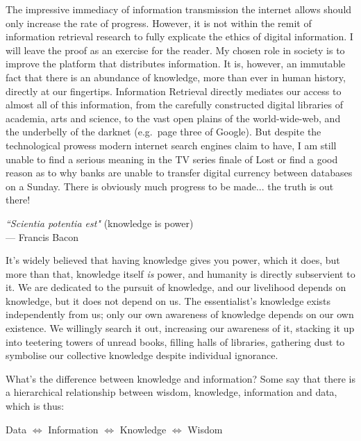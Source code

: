 The impressive immediacy of information transmission the internet allows should only increase the rate of progress. However, it is not within the remit of information retrieval research to fully explicate the ethics of digital information. I will leave the proof as an exercise for the reader. My chosen role in society is to improve the platform that distributes information. It is, however, an immutable fact that there is an abundance of knowledge, more than ever in human history, directly at our fingertips. Information Retrieval directly mediates our access to almost all of this information, from the carefully constructed digital libraries of academia, arts and science, to the vast open plains of the world-wide-web, and the underbelly of the darknet (e.g.\ page three of Google). But despite the technological prowess modern internet search engines claim to have, I am still unable to find a serious meaning in the TV series finale of Lost or find a good reason as to why banks are unable to transfer digital currency between databases on a Sunday. There is obviously much progress to be made... the truth is out there!

\begin{center}
    \textit{``Scientia potentia est"} (knowledge is power) 
    \\ --- Francis Bacon
\end{center}

It's widely believed that having knowledge gives you power, which it does, but more than that, knowledge itself \textit{is} power, and humanity is directly subservient to it. We are dedicated to the pursuit of knowledge, and our livelihood depends on knowledge, but it does not depend on us. The essentialist's knowledge exists independently from us; only our own awareness of knowledge depends on our own existence. We willingly search it out, increasing our awareness of it, stacking it up into teetering towers of unread books, filling halls of libraries, gathering dust to symbolise our collective knowledge despite individual ignorance.

What's the difference between knowledge and information? Some say \cite{lucky1989silicon} that there is a hierarchical relationship between wisdom, knowledge, information and data, which is thus:

\begin{center}

Data $\Longleftrightarrow$ Information $\Longleftrightarrow$ Knowledge $\Longleftrightarrow$ Wisdom

\end{center}

